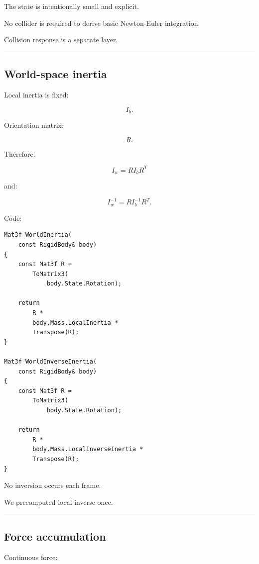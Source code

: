 The state is intentionally small and explicit.

No collider is required to derive basic Newton-Euler integration.

Collision response is a separate layer.

\begin{center}\rule{0.5\linewidth}{0.5pt}\end{center}

\subsection{World-space inertia}\label{06-engine-ii-ch039-world-space-inertia}

Local inertia is fixed:

\[
I_b.
\]

Orientation matrix:

\[
R.
\]

Therefore:

\[
\boxed{
I_w
=
RI_bR^T
}
\]

and:

\[
\boxed{
I_w^{-1}
=
RI_b^{-1}R^T.
}
\]

Code:

\begin{verbatim}
Mat3f WorldInertia(
    const RigidBody& body)
{
    const Mat3f R =
        ToMatrix3(
            body.State.Rotation);

    return
        R *
        body.Mass.LocalInertia *
        Transpose(R);
}

Mat3f WorldInverseInertia(
    const RigidBody& body)
{
    const Mat3f R =
        ToMatrix3(
            body.State.Rotation);

    return
        R *
        body.Mass.LocalInverseInertia *
        Transpose(R);
}
\end{verbatim}

No inversion occurs each frame.

We precomputed local inverse once.

\begin{center}\rule{0.5\linewidth}{0.5pt}\end{center}

\subsection{Force accumulation}\label{06-engine-ii-ch039-force-accumulation}

Continuous force:

